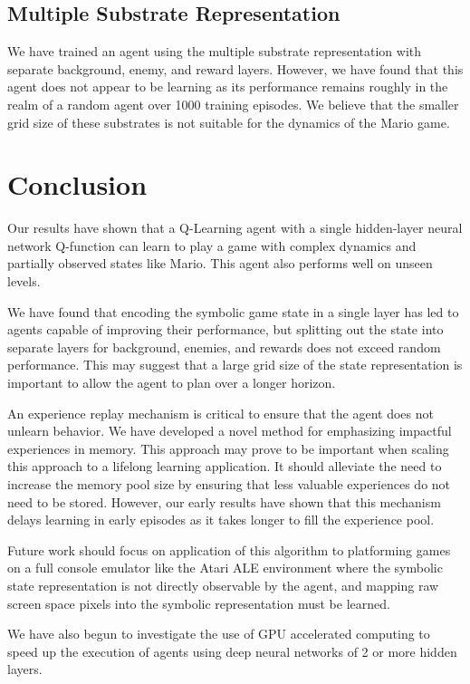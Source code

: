 \documentclass{article}
\begin{document}
 \subsection{Multiple Substrate Representation}
 We have trained an agent using the multiple substrate representation with separate background, enemy, and reward layers. However, we have found that this agent does not appear to be learning as its performance remains roughly in the realm of a random agent over 1000 training episodes. We believe that the smaller grid size of these substrates is not suitable for the dynamics of the Mario game.
 
 \section{Conclusion}
 
Our results have shown that a Q-Learning agent with a single hidden-layer neural network Q-function can learn to play a game with complex dynamics and partially observed states like Mario. This agent also performs well on unseen levels. 

We have found that encoding the symbolic game state in a single layer has led to agents capable of improving their performance, but splitting out the state into separate layers for background, enemies, and rewards does not exceed random performance. This may suggest that a large grid size of the state representation is important to allow the agent to plan over a longer horizon.
 
An experience replay mechanism is critical to ensure that the agent does not unlearn behavior. We have developed a novel method for emphasizing impactful experiences in memory. This approach may prove to be important when scaling this approach to a lifelong learning application. It should alleviate the need to increase the memory pool size by ensuring that less valuable experiences do not need to be stored. However, our early results have shown that this mechanism delays learning in early episodes as it takes longer to fill the experience pool.
 
Future work should focus on application of this algorithm to platforming games on a full console emulator like the Atari ALE environment where the symbolic state representation is not directly observable by the agent, and mapping raw screen space pixels into the symbolic representation must be learned. 

We have also begun to investigate the use of GPU accelerated computing to speed up the execution of agents using deep neural networks of 2 or more hidden layers.
 
\end{document}
